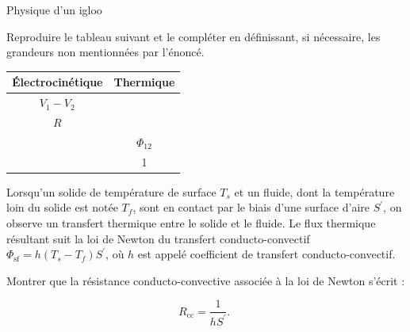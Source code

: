 \begin{exo}[PC][1][devoir]{Physique d'un igloo}
\begin{quest}
\item Reproduire le tableau suivant et le compléter en définissant, si nécessaire, les grandeurs non mentionnées par l'énoncé.

\begin{center}
\begin{tabular}{|c|c|}
\hline
Électrocinétique & Thermique \\
\hline
$V_{1}-V_{2}$ &  \\
\hline
$R$ &  \\
\hline
 & $\Phi_{12}$ \\
\hline
 & 1 \\
\hline
\end{tabular}
\end{center}

\end{quest}

Lorsqu'un solide de température de surface $T_{s}$ et un fluide, dont la température loin du solide est notée $T_{f}$, sont en contact par le biais d'une surface d'aire $S^{\prime}$, on observe un transfert thermique entre le solide et le fluide. Le flux thermique résultant suit la loi de Newton du transfert conducto-convectif $\Phi_{\mathrm{sf}}=h\left(T_{s}-T_{f}\right) S^{\prime}$, où $h$ est appelé coefficient de transfert conducto-convectif.

\begin{quest}
\item Montrer que la résistance conducto-convective associée à la loi de Newton s'écrit :

$$
R_{\mathrm{cc}}=\frac{1}{h S^{\prime}} \text {. }
$$
\end{quest}
\end{exo}
